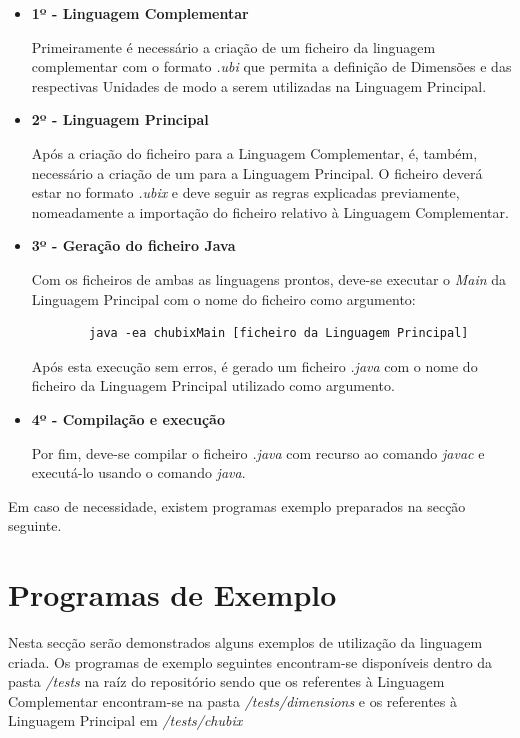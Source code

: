 \documentclass[10pt,portuguese]{article}
\begin{document}
\begin{itemize}
    \item \textbf{1º - Linguagem Complementar}
    \par Primeiramente é necessário a criação de um ficheiro da linguagem complementar com o formato \textit{.ubi} que permita a definição de Dimensões e das respectivas Unidades de modo a serem utilizadas na Linguagem Principal. 
    \item \textbf{2º - Linguagem Principal}
    \par Após a criação do ficheiro para a Linguagem Complementar, é, também, necessário a criação de um para a Linguagem Principal. O ficheiro deverá estar no formato \textit{.ubix} e deve seguir as regras explicadas previamente, nomeadamente a importação do ficheiro relativo à Linguagem Complementar.
    \item \textbf{3º - Geração do ficheiro Java}
    \par Com os ficheiros de ambas as linguagens prontos, deve-se executar o \textit{Main} da Linguagem Principal com o nome do ficheiro como argumento:
    \begin{lstlisting}
        java -ea chubixMain [ficheiro da Linguagem Principal]
    \end{lstlisting}
    \par Após esta execução sem erros, é gerado um ficheiro \textit{.java} com o nome do ficheiro da Linguagem Principal utilizado como argumento.
    \item \textbf{4º - Compilação e execução}
    \par Por fim, deve-se compilar o ficheiro \textit{.java} com recurso ao comando \textit{javac} e executá-lo usando o comando \textit{java}. 
\end{itemize}

\par Em caso de necessidade, existem programas exemplo preparados na secção seguinte.

\clearpage

\section{Programas de Exemplo}

\par Nesta secção serão demonstrados alguns exemplos de utilização da linguagem criada. Os programas de exemplo seguintes encontram-se disponíveis dentro da pasta \textit{/tests} na raíz do repositório sendo que os referentes à Linguagem Complementar encontram-se na pasta \textit{/tests/dimensions} e os referentes à Linguagem Principal em \textit{/tests/chubix}
\end{document}
